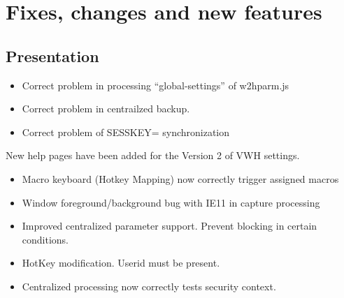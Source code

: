 \documentclass[letterpaper,10pt,english]{sphinxmanual}
\begin{document}
\chapter{Fixes, changes and new features}
\label{\detokenize{TN201902:fixes-changes-and-new-features}}

\section{Presentation}
\label{\detokenize{TN201902:presentation}}
\begin{itemize}
\item {} 
Correct problem in processing “global-settings” of w2hparm.js

\item {} 
Correct problem in centrailzed backup.

\item {} 
Correct problem of SESSKEY= synchronization

\end{itemize}

New help pages have been added for the Version 2 of VWH settings.

\begin{itemize}
\item {} 
Macro keyboard (Hotkey Mapping) now correctly trigger assigned macros

\end{itemize}

\begin{itemize}
\item {} 
Window foreground/background bug with IE11 in capture processing

\end{itemize}

\begin{itemize}
\item {} 
Improved centralized parameter support. Prevent blocking in certain conditions.

\item {} 
HotKey modification. Userid must be present.

\item {} 
Centralized processing now correctly tests security context.

\end{itemize}
\end{document}
